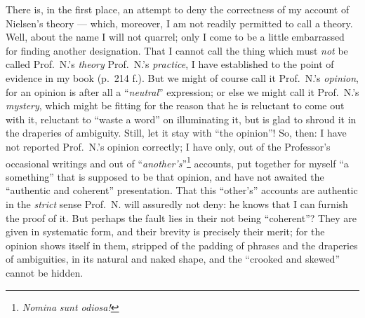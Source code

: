 \documentclass[12pt,a4paper]{book}
\begin{document}
There is, in the first place, an attempt to deny the correctness of my account
of Nielsen's theory --- which, moreover, I am not readily permitted to call a
theory. Well, about the name I will not quarrel; only I come to be a little
embarrassed for finding another designation. That I cannot call the thing which
must \emph{not} be called Prof.\ N.'s \emph{theory} Prof.\ N.'s
\emph{practice}, I have established to the point of evidence in my book
(p.\ 214 f.). But we might of course call it Prof.\ N.'s \emph{opinion}, for an
opinion is after all a ``\emph{neutral}'' expression; or else we might call it
Prof.\ N.'s \emph{mystery}, which might be fitting for the reason that he is
reluctant to come out with it, reluctant to ``waste a word'' on illuminating
it, but is glad to shroud it in the draperies of ambiguity. Still, let it stay
with ``the opinion''! So, then: I have not reported Prof.\ N.'s opinion
correctly; I have only, out of the Professor's occasional writings and out of
``\emph{another's}''\footnote{%
  \emph{\textit{Nomina}} \textit{sunt odiosa!}}
accounts, put together for myself ``a something'' that is supposed to be that
opinion, and have not awaited the ``authentic and coherent'' presentation. That
this ``other's'' accounts are authentic in the \emph{strict} sense Prof.\ N.
will assuredly not deny: he knows that I
\setcounter{footnote}{0}%
can furnish the proof of it. But perhaps the fault lies in their not being
``coherent''? They are given in systematic form, and their brevity is precisely
their merit; for the opinion shows itself in them, stripped of the padding of
phrases and the draperies of ambiguities, in its natural and naked shape, and
the ``crooked and skewed'' cannot be hidden.
\end{document}
